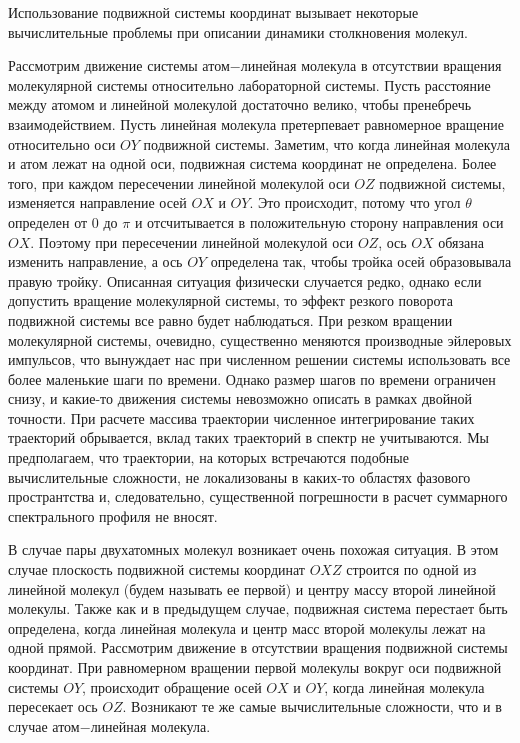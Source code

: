 Использование подвижной системы координат вызывает некоторые вычислительные проблемы при описании динамики столкновения молекул. \par
Рассмотрим движение системы атом$-$линейная молекула в отсутствии вращения молекулярной системы относительно лабораторной системы. Пусть расстояние между атомом и линейной молекулой достаточно велико, чтобы пренебречь взаимодействием. Пусть линейная молекула претерпевает равномерное вращение относительно оси $OY$ подвижной системы. Заметим, что когда линейная молекула и атом лежат на одной оси, подвижная система координат не определена. Более того, при каждом пересечении линейной молекулой оси $OZ$ подвижной системы, изменяется направление осей $OX$ и $OY$. Это происходит, потому что угол $\theta$ определен от $0$ до $\pi$ и отсчитывается в положительную сторону направления оси $OX$. Поэтому при пересечении линейной молекулой оси $OZ$, ось $OX$ обязана изменить направление, а ось $OY$ определена так, чтобы тройка осей образовывала правую тройку. Описанная ситуация физически случается редко, однако если допустить вращение молекулярной системы, то эффект резкого поворота подвижной системы все равно будет наблюдаться. При резком вращении молекулярной системы, очевидно, существенно меняются производные эйлеровых импульсов, что вынуждает нас при численном решении системы использовать все более маленькие шаги по времени. Однако размер шагов по времени ограничен снизу, и какие-то движения системы невозможно описать в рамках двойной точности. При расчете массива траектории численное интегрирование таких траекторий обрывается, вклад таких траекторий в спектр не учитываются. Мы предполагаем, что траектории, на которых встречаются подобные вычислительные сложности, не локализованы в каких-то областях фазового пространтства и, следовательно, существенной погрешности в расчет суммарного спектрального профиля не вносят. \par
В случае пары двухатомных молекул возникает очень похожая ситуация. В этом случае плоскость подвижной системы координат $OXZ$ строится по одной из линейной молекул (будем называть ее первой) и центру массу второй линейной молекулы. Также как и в предыдущем случае, подвижная система перестает быть определена, когда линейная молекула и центр масс второй молекулы лежат на одной прямой. Рассмотрим движение в отсутствии вращения подвижной системы координат. При равномерном вращении первой молекулы вокруг оси подвижной системы $OY$, происходит обращение осей $OX$ и $OY$, когда линейная молекула пересекает ось $OZ$. Возникают те же самые вычислительные сложности, что и в случае атом$-$линейная молекула. \par
